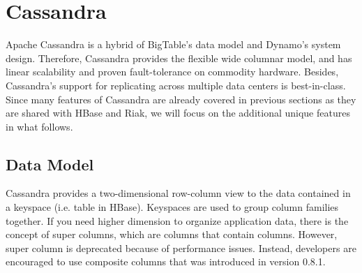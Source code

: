 \documentclass[12pt]{book}
\begin{document}
\section[Cassandra]
{Cassandra}
Apache Cassandra \cite{Lakshman:2010:CDS, Cassandra} is a hybrid of BigTable's data model and Dynamo's system design. Therefore, Cassandra provides the flexible wide columnar model, and has linear scalability and proven fault-tolerance on commodity hardware. Besides, Cassandra's support for replicating across multiple data centers is best-in-class. Since many features of Cassandra are already covered in previous sections as they are shared with HBase and Riak, we will focus on the additional unique features in what follows.

\subsection{Data Model}

Cassandra provides a two-dimensional row-column view to the data contained in a keyspace (i.e. table in HBase). Keyspaces are used to group column families together. If you need higher dimension to organize application data, there is the concept of super columns, which are columns that contain columns. However, super column is deprecated because of performance issues. Instead, developers are encouraged to use composite columns that was introduced in version 0.8.1. 
\end{document}
